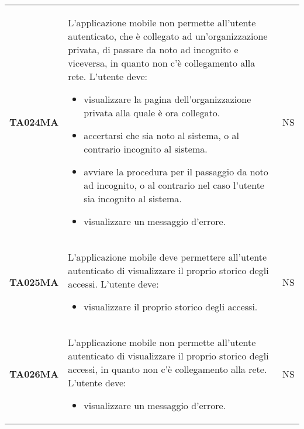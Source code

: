 \documentclass[../piano-di-qualifica.tex]{subfiles}
\begin{document}
\begin{longtable}[H]{>{\centering\bfseries}m{3cm} >{}m{10cm} >{\centering\arraybackslash}m{3cm}}
  TA024MA           & L'applicazione mobile non permette all'utente autenticato, che è collegato ad un'organizzazione privata, di passare da noto ad incognito e viceversa, in quanto non c'è collegamento alla rete. \newline
  L'utente deve:
  \begin{itemize}
    \item visualizzare la pagina dell'organizzazione privata alla quale è ora collegato.
    \item accertarsi che sia noto al sistema, o al contrario incognito al sistema.
    \item avviare la procedura per il passaggio da noto ad incognito, o al contrario nel caso l'utente sia incognito al sistema.
    \item visualizzare un messaggio d'errore.
  \end{itemize}
                    & NS                                                                                                                                                                                                                                                               \\
  TA025MA           & L'applicazione mobile deve permettere all'utente autenticato di visualizzare il proprio storico degli accessi. \newline
  L'utente deve:
  \begin{itemize}
    \item visualizzare il proprio storico degli accessi.
  \end{itemize}
                    & NS                                                                                                                                                                                                                                                               \\
  TA026MA           & L'applicazione mobile non permette all'utente autenticato di visualizzare il proprio storico degli accessi, in quanto non c'è collegamento alla rete. \newline
  L'utente deve:
  \begin{itemize}
    \item visualizzare un messaggio d'errore.
  \end{itemize}
                    & NS                                                                                                                                                                                                                                                               \\

\end{longtable}
\end{document}
